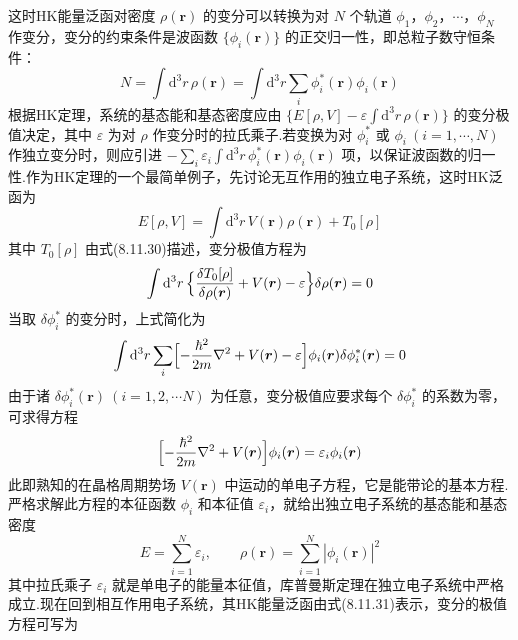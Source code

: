 这时HK能量泛函对密度 $\rho(\boldsymbol{r})$ 的变分可以转换为对 $N$ 个轨道 $\phi_{1}$，$\phi_{2}$，$\cdots$，$\phi_{N}$ 作变分，变分的约束条件是波函数 $\{\phi_{i}(\boldsymbol{r})\}$ 的正交归一性，即总粒子数守恒条件：
\begin{equation}
  N=\int\mathrm{d}^{3}r\,\rho(\boldsymbol{r})
  =\int\mathrm{d}^{3}r\sum_{i}\phi_{i}^{*}(\boldsymbol{r})\phi_{i}(\boldsymbol{r})
\end{equation}
根据HK定理，系统的基态能和基态密度应由 $\{E[\rho,V]-\varepsilon\int\mathrm{d}^{3}r\,\rho(\boldsymbol{r})\}$ 的变分极值决定，其中 $\varepsilon$ 为对 $\rho$ 作变分时的拉氏乘子.若变换为对 $\phi_{i}^{*}$ 或 $\phi_{i}\ (i=1,\cdots,N)$ 作独立变分时，则应引进 $-\sum_{i}\varepsilon_{i}\int\mathrm{d}^{3}r\,\phi_{i}^{*}(\boldsymbol{r})\phi_{i}(\boldsymbol{r})$ 项，以保证波函数的归一性.作为HK定理的一个最简单例子，先讨论无互作用的独立电子系统，这时HK泛函为
\begin{equation}
  E[\rho,V]=\int\mathrm{d}^{3}r\,V(\boldsymbol{r})\rho(\boldsymbol{r})+T_{0}[\rho]
\end{equation}
其中 $T_{0}[\rho]$ 由式(8.11.30)描述，变分极值方程为
\begin{equation}
  \int\mathrm{d}^{3}r\,\Bigl\{\frac{\delta T_{0}[\rho]}{\delta\rho(\boldsymbol{r})}+V(\boldsymbol{r})-\varepsilon\Bigr\}\delta\rho(\boldsymbol{r})=0
\end{equation}
当取 $\delta\phi_{i}^{*}$ 的变分时，上式简化为
\begin{equation}
  \int\mathrm{d}^{3}r\sum_{i}\Bigl[-\frac{\hbar^{2}}{2m}\nabla^{2}+V(\boldsymbol{r})-\varepsilon\Bigr]\phi_{i}(\boldsymbol{r})\delta\phi_{i}^{*}(\boldsymbol{r})=0
\end{equation}
由于诸 $\delta\phi_{i}^{*}(\boldsymbol{r})\ (i=1,2,\cdots N)$ 为任意，变分极值应要求每个 $\delta\phi_{i}^{*}$ 的系数为零，可求得方程
\begin{equation}
  \Bigl[-\frac{\hbar^{2}}{2m}\nabla^{2}+V(\boldsymbol{r})\Bigr]\phi_{i}(\boldsymbol{r})=\varepsilon_{i}\phi_{i}(\boldsymbol{r})
\end{equation}
此即熟知的在晶格周期势场 $V(\boldsymbol{r})$ 中运动的单电子方程，它是能带论的基本方程.严格求解此方程的本征函数 $\phi_{i}$ 和本征值 $\varepsilon_{i}$，就给出独立电子系统的基态能和基态密度
\begin{equation}
  E=\sum_{i=1}^{N}\varepsilon_{i},\qquad
  \rho(\boldsymbol{r})=\sum_{i=1}^{N}|\phi_{i}(\boldsymbol{r})|^{2}
\end{equation}
其中拉氏乘子 $\varepsilon_{i}$ 就是单电子的能量本征值，库普曼斯定理在独立电子系统中严格成立.现在回到相互作用电子系统，其HK能量泛函由式(8.11.31)表示，变分的极值方程可写为
